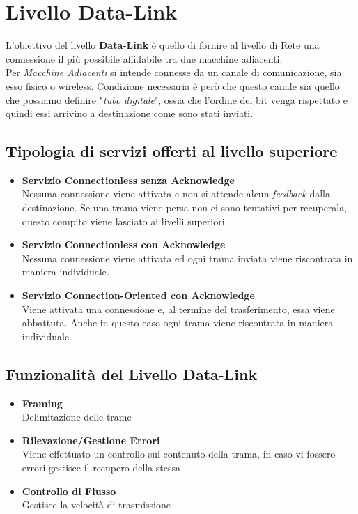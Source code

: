 \documentclass{article}
\begin{document}
\newpage                        
    \section{Livello Data-Link}
        L'obiettivo del livello \textbf{Data-Link} è quello di fornire al livello di Rete una connessione il più possibile affidabile tra due macchine adiacenti.\\
        Per \textit{Macchine Adiacenti} si intende connesse da un canale di comunicazione, sia esso fisico o wireless. Condizione necessaria è però che questo canale sia quello che possiamo definire "\textit{tubo digitale}", ossia che l'ordine dei bit venga rispettato e quindi essi arrivino a destinazione come sono stati inviati.

        \subsection{Tipologia di servizi offerti al livello superiore}
            \begin{itemize}
                \item \textbf{Servizio Connectionless senza Acknowledge} \\
                      Nessuna connessione viene attivata e non si attende alcun \textit{feedback} dalla destinazione. Se una trama viene persa non ci sono tentativi per recuperala, questo compito viene lasciato ai livelli superiori.
                \item \textbf{Servizio Connectionless con Acknowledge} \\
                      Nessuna connessione viene attivata ed ogni trama inviata viene riscontrata in maniera individuale.
                \item \textbf{Servizio Connection-Oriented con Acknowledge} \\
                      Viene attivata una connessione e, al termine del trasferimento, essa viene abbattuta. Anche in questo caso ogni trama viene riscontrata in maniera individuale.
            \end{itemize}

        \subsection{Funzionalità del Livello Data-Link}
            \begin{itemize}
                \item \textbf{Framing} \\
                      Delimitazione delle trame
                \item \textbf{Rilevazione/Gestione Errori} \\
                      Viene effettuato un controllo sul contenuto della trama, in caso vi fossero errori gestisce il recupero della stessa
                \item \textbf{Controllo di Flusso} \\
                      Gestisce la velocità di trasmissione
            \end{itemize}
\end{document}
